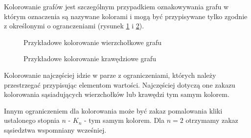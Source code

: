     \begin{definition}
      Kolorowanie grafów jest szczególnym przypadkiem oznakowywania grafu w którym oznaczenia są nazywane kolorami i mogą być przypisywane tylko zgodnie z określonymi o
       ogranczeniami (rysunek \ref{kolor3} i \ref{kolor4}). 
    \end{definition}

    \begin{figure}[H]
      \centering
        \caption{Przykładowe kolorowanie wierzchołkowe grafu}
        \label{kolor3}
     \end{figure}

    \begin{figure}[H]
      \centering
        \caption{Przykładowe kolorowanie krawędziowe grafu}
        \label{kolor4}
     \end{figure}

     Kolorowanie najczęściej idzie w parze z ograniczeniami, których należy przestrzegać przypisując elementom wartości.
     Najczęściej dotyczą one zakazu kolorowania sąsiadujących wierzchołków lub krawędzi tym samym kolorem. 

     Innym ograniczeniem dla kolorowania może być zakaz pomalowania kliki ustalonego stopnia $n$ - $K_n$ - tym samym kolorem.
     Dla $n=2$ otrzymamy zakaz sąsiedztwa wspomniany wcześniej.